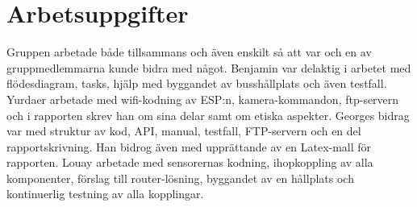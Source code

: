 \section{Arbetsuppgifter}
Gruppen arbetade både tillsammans och även enskilt så att var och en av gruppmedlemmarna kunde bidra med något. Benjamin var delaktig i arbetet med flödesdiagram, tasks, hjälp med byggandet av busshållplats och även testfall. Yurdaer arbetade med wifi-kodning av ESP:n, kamera-kommandon, ftp-servern och i rapporten skrev han om sina delar samt om etiska aspekter. Georges bidrag var med struktur av kod, API, manual, testfall, FTP-servern och en del rapportskrivning. Han bidrog även med upprättande av en Latex-mall för rapporten. Louay arbetade med sensorernas kodning, ihopkoppling av alla komponenter, förslag till router-lösning, byggandet av en hållplats och kontinuerlig testning av alla kopplingar. 



 




